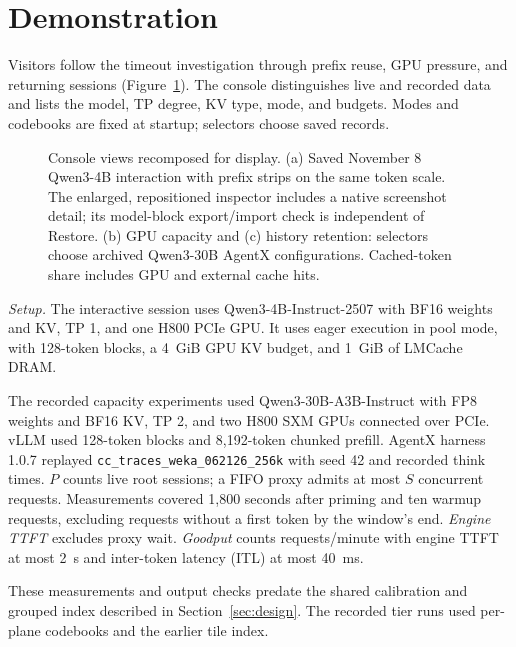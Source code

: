 \documentclass[conference]{IEEEtran}
\begin{document}
\section{Demonstration}
\label{sec:demo}
Visitors follow the timeout investigation through prefix reuse, GPU
pressure, and returning sessions (Figure~\ref{fig:views}). The console
distinguishes live and recorded data and lists the model, TP degree, KV type, mode, and budgets. Modes and codebooks
are fixed at startup; selectors choose saved records.

\begin{figure}[!b]
\centering

\caption{Console views recomposed for display.
(a) Saved November 8 Qwen3-4B interaction with prefix strips on the same
token scale. The enlarged, repositioned inspector includes a native
screenshot detail; its model-block export/import check is independent of Restore. (b) GPU capacity and
(c) history retention: selectors choose archived Qwen3-30B AgentX
configurations. Cached-token share includes GPU and external cache hits.}
\label{fig:views}
\end{figure}

\emph{Setup.} The interactive session uses Qwen3-4B-Instruct-2507 with BF16
weights and KV, TP 1, and one H800 PCIe GPU. It uses eager execution in pool
mode, with 128-token blocks, a 4~GiB GPU KV budget, and 1~GiB of LMCache DRAM.

The recorded capacity experiments used Qwen3-30B-A3B-Instruct
with FP8 weights and BF16 KV, TP 2, and two H800 SXM GPUs connected over
PCIe. vLLM used 128-token blocks and 8,192-token chunked prefill.
AgentX harness 1.0.7 replayed \texttt{cc\_traces\_weka\_062126\_256k} with
seed 42 and recorded think times. $P$ counts live root sessions; a FIFO
proxy admits at most $S$ concurrent requests. Measurements covered
1,800 seconds after priming and ten warmup requests, excluding requests
without a first token by the window's end. \emph{Engine TTFT} excludes
proxy wait. \emph{Goodput} counts requests/minute with engine TTFT at most
2~s and inter-token latency (ITL) at most 40~ms.

These measurements and output checks predate the shared calibration and
grouped index described in Section~\ref{sec:design}. The recorded tier runs
used per-plane codebooks and the earlier tile index.
\end{document}
